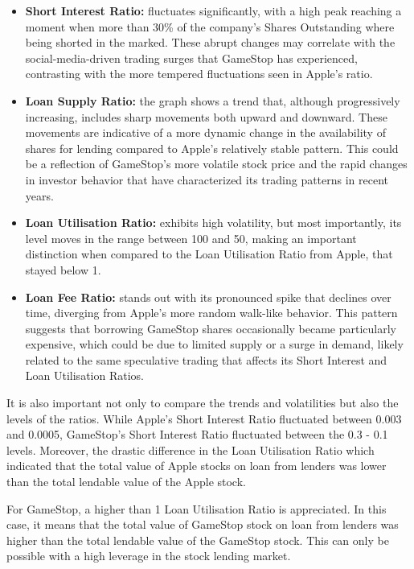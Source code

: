 \begin{itemize}
	\item\textbf{Short Interest Ratio:} fluctuates significantly, with a high peak reaching a moment when more than 30\% of the company's Shares Outstanding where being shorted in the marked. These abrupt changes may correlate with the social-media-driven trading surges that GameStop has experienced, contrasting with the more tempered fluctuations seen in Apple's ratio.
	\item\textbf{Loan Supply Ratio:} the graph shows a trend that, although progressively increasing, includes sharp movements both upward and downward. These movements are indicative of a more dynamic change in the availability of shares for lending compared to Apple's relatively stable pattern. This could be a reflection of GameStop's more volatile stock price and the rapid changes in investor behavior that have characterized its trading patterns in recent years.
	\item\textbf{Loan Utilisation Ratio:} exhibits high volatility, but most importantly, its level moves in the range between 100 and 50, making an important distinction when compared to the Loan Utilisation Ratio from Apple, that stayed below 1.
	\item\textbf{Loan Fee Ratio:} stands out with its pronounced spike that declines over time, diverging from Apple's more random walk-like behavior. This pattern suggests that borrowing GameStop shares occasionally became particularly expensive, which could be due to limited supply or a surge in demand, likely related to the same speculative trading that affects its Short Interest and Loan Utilisation Ratios.
\end{itemize}

It is also important not only to compare the trends and volatilities but also the levels of the ratios. While Apple's Short Interest Ratio fluctuated between 0.003 and 0.0005, GameStop's Short Interest Ratio fluctuated between the 0.3 - 0.1 levels. Moreover, the drastic difference in the Loan Utilisation Ratio which indicated that the total value of Apple stocks on loan from lenders was lower than the total lendable value of the Apple stock.

For GameStop, a higher than 1 Loan Utilisation Ratio is appreciated. In this case, it means that the total value of GameStop stock on loan from lenders was higher than the total lendable value of the GameStop stock. This can only be possible with a high leverage in the stock lending market.



